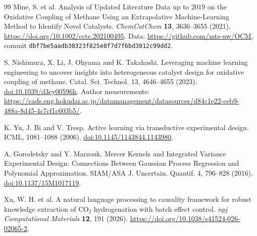 \begin{thebibliography}{99}
 Mine, S. et al. Analysis of Updated Literature Data up to 2019 on the Oxidative Coupling of Methane Using an Extrapolative Machine-Learning Method to Identify Novel Catalysts. \emph{ChemCatChem} \textbf{13}, 3636--3655 (2021). \url{https://doi.org/10.1002/cctc.202100495}. Data: \url{https://github.com/mts-uw/OCM}, commit \texttt{dbf7be5aadb30323f825e8f7d7f6bd3012c99dd2}.

 S. Nishimura, X. Li, J. Ohyama and K. Takahashi. Leveraging machine learning engineering to uncover insights into heterogeneous catalyst design for oxidative coupling of methane. Catal. Sci. Technol. 13, 4646--4655 (2023). \href{https://doi.org/10.1039/d3cy00596h}{doi:10.1039/d3cy00596h}. Author measurements: \url{https://cads.eng.hokudai.ac.jp/datamanagement/datasources/d84c1e22-ceb9-488a-8d45-4c7cf1c603b5/}.

 K. Yu, J. Bi and V. Tresp. Active learning via transductive experimental design. ICML, 1081--1088 (2006). \href{https://doi.org/10.1145/1143844.1143980}{doi:10.1145/1143844.1143980}.

 A. Gorodetsky and Y. Marzouk. Mercer Kernels and Integrated Variance Experimental Design: Connections Between Gaussian Process Regression and Polynomial Approximation. SIAM/ASA J. Uncertain. Quantif. 4, 796--828 (2016). \href{https://doi.org/10.1137/15M1017119}{doi:10.1137/15M1017119}.



 Xu, W. H. et al. A natural language processing to causality framework for robust knowledge extraction of CO$_2$ hydrogenation with batch effect control. \emph{npj Computational Materials} \textbf{12}, 191 (2026). \url{https://doi.org/10.1038/s41524-026-02065-2}.


\end{thebibliography}
